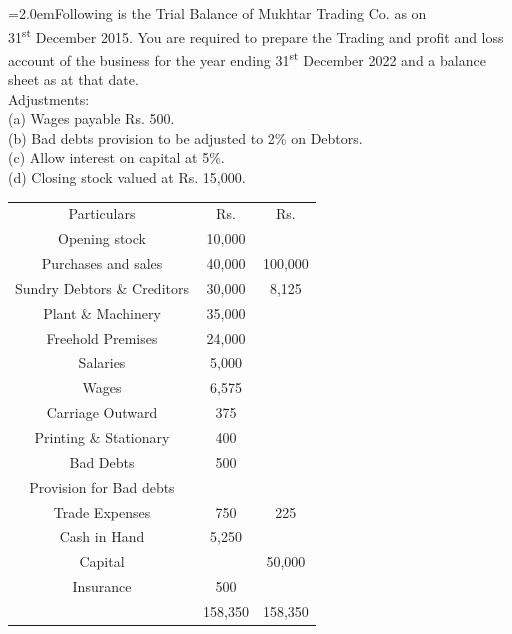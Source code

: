 \documentclass[11pt,a4paper]{article}
\newcommand{\lqn}[2]{\Needspace{6\baselineskip}\par\medskip\noindent\hangindent=2.0em\hangafter=1\makebox[2.0em][l]{\textbf{#1.}}#2\par}
\begin{document}
\lqn{103}{Following is the Trial Balance of Mukhtar Trading Co. as on\\
31\textsuperscript{st} December 2015. You are required to prepare the Trading and profit and loss account of the business for the year ending 31\textsuperscript{st} December 2022 and a balance sheet as at that date.\\
Adjustments:\\
(a) Wages payable Rs. 500.\\
(b) Bad debts provision to be adjusted to 2\% on Debtors.\\
(c) Allow interest on capital at 5\%.\\
(d) Closing stock valued at Rs. 15,000.\par
\par\smallskip\noindent\hspace*{1.2em}\begin{tabular}{|ccc|}
\hline
Particulars & Rs. & Rs. \\
Opening stock & 10,000 &  \\
Purchases and sales & 40,000 & 100,000 \\
Sundry Debtors \& Creditors & 30,000 & 8,125 \\
Plant \& Machinery & 35,000 &  \\
Freehold Premises & 24,000 &  \\
Salaries & 5,000 &  \\
Wages & 6,575 &  \\
Carriage Outward & 375 &  \\
Printing \& Stationary & 400 &  \\
Bad Debts & 500 &  \\
Provision for Bad debts &  &  \\
Trade Expenses & 750 & 225 \\
Cash in Hand & 5,250 &  \\
Capital &  & 50,000 \\
Insurance & 500 &  \\
 & 158,350 & 158,350 \\
\hline
\end{tabular}\par\smallskip
}
\end{document}
